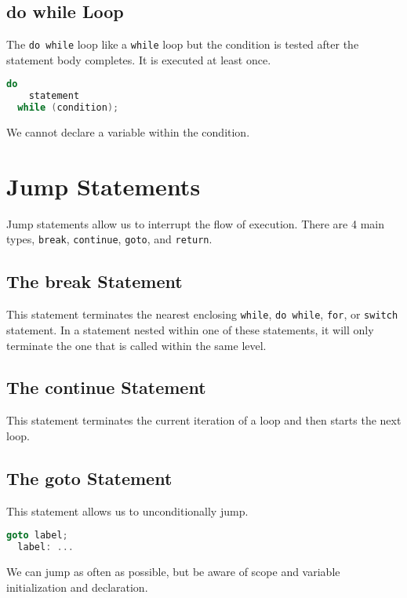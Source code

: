 \documentclass[12pt, a4paper]{report}
\begin{document}
\subsection{do while Loop}
The \verb|do while| loop like a \verb|while| loop but the condition is tested after the statement body completes.
It is executed at least once.
\begin{lstlisting}[language=C++]
  do
    statement
  while (condition);
\end{lstlisting}
We cannot declare a variable within the condition.
\section{Jump Statements}
Jump statements allow us to interrupt the flow of execution.
There are 4 main types, \verb|break|, \verb|continue|, \verb|goto|, and \verb|return|.

\subsection{The break Statement}
This statement terminates the nearest enclosing \verb|while|, \verb|do while|, \verb|for|, or \verb|switch| statement.
In a statement nested within one of these statements, it will only terminate the one that is called within the same level.
\subsection{The continue Statement}
This statement terminates the current iteration of a loop and then starts the next loop.
\subsection{The goto Statement}
This statement allows us to unconditionally jump.
\begin{lstlisting}[language=C++]
  goto label;
  label: ...
\end{lstlisting}
We can jump as often as possible, but be aware of scope and variable initialization and declaration.
\end{document}
